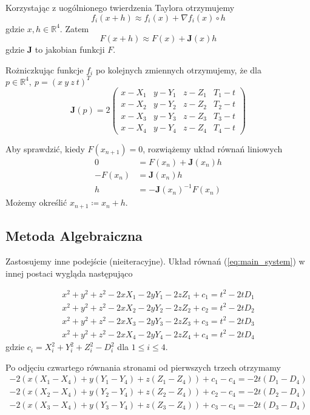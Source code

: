 \documentclass{article}
\begin{document}
\noindent Korzystając z uogólnionego twierdzenia Taylora otrzymujemy
\[
f_i(x+h) \approx f_i(x) + \nabla f_i(x) \circ h
\]
gdzie $x, h \in \mathbb{R}^4$.
Zatem
\[
F(x+h) \approx F(x) + \mathbf{J}(x)h
\]
gdzie $\mathbf{J}$ to jakobian funkcji $F$.

\noindent Rożniczkując funkcje $f_i$ po kolejnych zmiennych otrzymujemy, że dla $p \in \mathbb{R}^4,\ p=(x \ y \ z \ t)^T$
\[
\mathbf{J}(p) = 2
\begin{pmatrix}
    x-X_1  & y-Y_1 & z-Z_1 & T_1-t \\
    x-X_2  & y-Y_2 & z-Z_2 & T_2-t \\
    x-X_3  & y-Y_3 & z-Z_3 & T_3-t \\
    x-X_4  & y-Y_4 & z-Z_4 & T_4-t
\end{pmatrix}
\]

\noindent Aby sprawdzić, kiedy $F(x_{n+1}) = 0$, rozwiążemy układ równań liniowych
\begin{align*}
    0 &= F(x_n) + \mathbf{J}(x_n)h \\
    -F(x_n) &= \mathbf{J}(x_n)h \\
    h &= -\mathbf{J}(x_n)^{-1}F(x_n)
\end{align*}
Możemy określić $x_{n+1} \coloneqq x_n + h$.


\subsection{Metoda Algebraiczna}
Zastosujemy inne podejście (nieiteracyjne). Układ równań (\ref{eq:main_system}) w innej postaci
wygląda następująco

\begin{equation}
\begin{aligned}
    x^2 + y^2 + z^2 -2xX_1 -2yY_1 -2zZ_1 + c_1 = t^2 -2tD_1 \\
    x^2 + y^2 + z^2 -2xX_2 -2yY_2 -2zZ_2 + c_2 = t^2 -2tD_2 \\
    x^2 + y^2 + z^2 -2xX_3 -2yY_3 -2zZ_3 + c_3 = t^2 -2tD_3 \\
    x^2 + y^2 + z^2 -2xX_4 -2yY_4 -2zZ_4 + c_4 = t^2 -2tD_4
\end{aligned}
\end{equation}
gdzie $c_i=X_i^2+Y_i^2+Z_i^2-D_i^2$ dla $1 \leq i \leq 4$.

\noindent Po odjęciu czwartego równania stronami od pierwszych trzech otrzymamy
\begin{equation}
\begin{aligned}
    -2( x(X_1-X_4) + y(Y_1-Y_4) + z(Z_1-Z_4) ) + c_1 - c_4 = -2t(D_1-D_4) \\
    -2( x(X_2-X_4) + y(Y_2-Y_4) + z(Z_2-Z_4) ) + c_2 - c_4 = -2t(D_2-D_4) \\
    -2( x(X_3-X_4) + y(Y_3-Y_4) + z(Z_3-Z_4) ) + c_3 - c_4 = -2t(D_3-D_4)
\end{aligned}
\end{equation}
\end{document}
